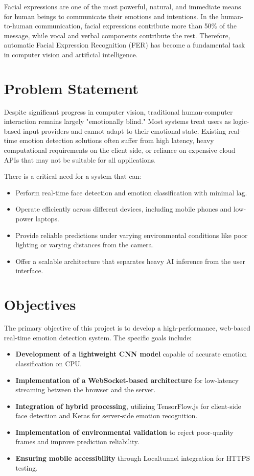 \documentclass[12pt,a4paper]{report}
\begin{document}
Facial expressions are one of the most powerful, natural, and immediate means for human beings to communicate their emotions and intentions. In the human-to-human communication, facial expressions contribute more than 50\% of the message, while vocal and verbal components contribute the rest. Therefore, automatic Facial Expression Recognition (FER) has become a fundamental task in computer vision and artificial intelligence.

\section{Problem Statement}
Despite significant progress in computer vision, traditional human-computer interaction remains largely "emotionally blind." Most systems treat users as logic-based input providers and cannot adapt to their emotional state. Existing real-time emotion detection solutions often suffer from high latency, heavy computational requirements on the client side, or reliance on expensive cloud APIs that may not be suitable for all applications.

There is a critical need for a system that can:
\begin{itemize}
    \item Perform real-time face detection and emotion classification with minimal lag.
    \item Operate efficiently across different devices, including mobile phones and low-power laptops.
    \item Provide reliable predictions under varying environmental conditions like poor lighting or varying distances from the camera.
    \item Offer a scalable architecture that separates heavy AI inference from the user interface.
\end{itemize}

\section{Objectives}
The primary objective of this project is to develop a high-performance, web-based real-time emotion detection system. The specific goals include:
\begin{itemize}
    \item \textbf{Development of a lightweight CNN model} capable of accurate emotion classification on CPU.
    \item \textbf{Implementation of a WebSocket-based architecture} for low-latency streaming between the browser and the server.
    \item \textbf{Integration of hybrid processing}, utilizing TensorFlow.js for client-side face detection and Keras for server-side emotion recognition.
    \item \textbf{Implementation of environmental validation} to reject poor-quality frames and improve prediction reliability.
    \item \textbf{Ensuring mobile accessibility} through Localtunnel integration for HTTPS testing.
\end{itemize}
\end{document}
